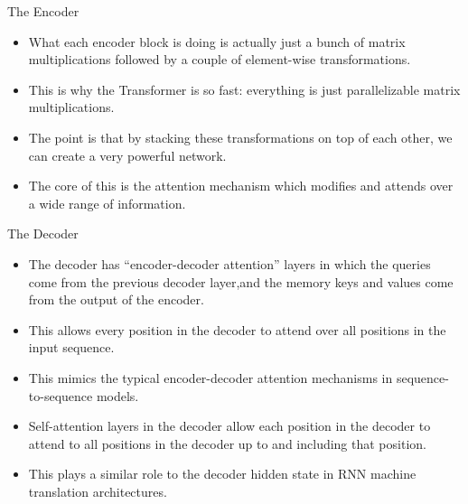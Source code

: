 \documentclass[handout]{beamer}
\begin{document}
\begin{frame}{The Encoder}
\begin{scriptsize}
\begin{itemize}

 \item  What each encoder block is doing is actually just a bunch of matrix multiplications followed by a couple of element-wise transformations.
 
 \item This is why the Transformer is so fast: everything is just parallelizable matrix multiplications.
 
 \item The point is that by stacking these transformations on top of each other, we can create a very powerful network. 
 
 \item The core of this is the attention mechanism which modifies and attends over a wide range of information.
 
\end{itemize}

\end{scriptsize}

\end{frame}



\begin{frame}{The Decoder}
\begin{scriptsize}
\begin{itemize}



\item The decoder has ``encoder-decoder attention'' layers in which the queries come from the previous decoder layer,and the memory keys and values come from the output of the encoder.

\item This allows every position in the decoder to attend over all positions in the input sequence.

\item This mimics the typical encoder-decoder attention mechanisms in sequence-to-sequence models.

\item Self-attention layers in the decoder allow each position in the decoder to attend to all positions in the decoder up to and including that position.

 \item This plays a similar role to the decoder hidden state in RNN machine translation architectures.


 
\end{itemize}

\end{scriptsize}

\end{frame}
\end{document}
